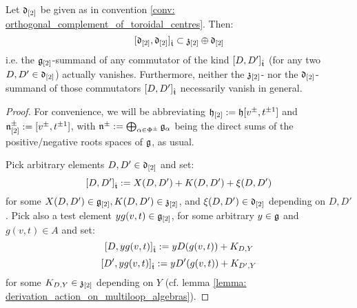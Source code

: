         \begin{proposition} \label{prop: lie_bracket_on_orthogonal_complement_of_toroidal_centre}
            Let $\mathfrak{d}_{[2]}$ be given as in convention \ref{conv: orthogonal_complement_of_toroidal_centres}. Then:
                $$[ \mathfrak{d}_{[2]}, \mathfrak{d}_{[2]} ]_{\hat{\mathfrak{t}}} \subset \mathfrak{z}_{[2]} \oplus \mathfrak{d}_{[2]}$$
            i.e. the $\mathfrak{g}_{[2]}$-summand of any commutator of the kind $[D, D']_{\hat{\mathfrak{t}}}$ (for any two $D, D' \in \mathfrak{d}_{[2]}$) actually vanishes. Furthermore, neither the $\mathfrak{z}_{[2]}$- nor the $\mathfrak{d}_{[2]}$-summand of those commutators $[D, D']_{\hat{\mathfrak{t}}}$ necessarily vanish in general. 
        \end{proposition}
            \begin{proof}
                For convenience, we will be abbreviating $\mathfrak{h}_{[2]} := \mathfrak{h}[v^{\pm}, t^{\pm 1}]$ and $\mathfrak{n}^{\pm}_{[2]} := [v^{\pm}, t^{\pm 1}]$, with $\mathfrak{n}^{\pm} := \bigoplus_{\alpha \in \Phi^{\pm}} \mathfrak{g}_{\alpha}$ being the direct sums of the positive/negative roots spaces of $\mathfrak{g}$, as usual.
            
                Pick arbitrary elements $D, D' \in \mathfrak{d}_{[2]}$ and set:
                    $$[D, D']_{\hat{\mathfrak{t}}} := X(D, D') + K(D, D') + \xi(D, D')$$
                for some $X(D, D') \in \mathfrak{g}_{[2]}, K(D, D') \in \mathfrak{z}_{[2]}$, and $\xi(D, D') \in \mathfrak{d}_{[2]}$ depending on $D, D'$. Pick also a test element $y g(v, t) \in \mathfrak{g}_{[2]}$, for some arbitrary $y \in \mathfrak{g}$ and $g(v, t) \in A$ and set:
                    $$[D, y g(v, t)]_{\hat{\mathfrak{t}}} := y D( g(v, t) ) + K_{D, Y}$$
                    $$[D', y g(v, t)]_{\hat{\mathfrak{t}}} := y D'( g(v, t) ) + K_{D', Y}$$
                for some $K_{D, Y} \in \mathfrak{z}_{[2]}$ depending on $Y$ (cf. lemma \ref{lemma: derivation_action_on_multiloop_algebras}).
                

\end{proof}

